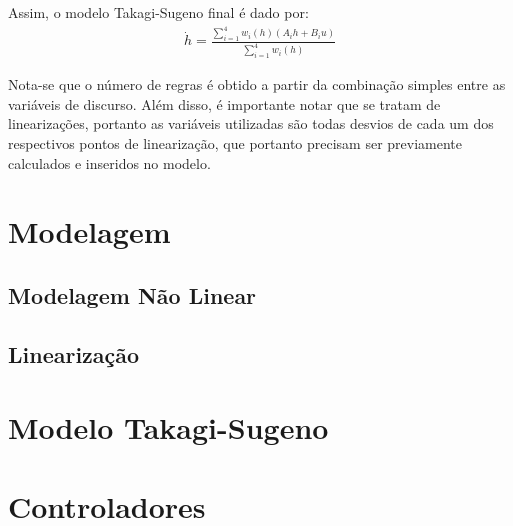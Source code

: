 \begin{itemize}
	Assim, o modelo Takagi-Sugeno final é dado por:
	\begin{align*}
		\dot{h} = \frac{\sum_{i=1}^{4}  w_i(h)(A_ih + B_i u)}{\sum_{i=1}^{4} w_i(h)}
	\end{align*}
	
	Nota-se que o número de regras é obtido a partir da combinação simples entre as variáveis de discurso. Além disso, é importante notar que se tratam de linearizações, portanto as variáveis utilizadas são todas desvios de cada um dos respectivos pontos de linearização, que portanto precisam ser previamente calculados e inseridos no modelo.
	
\end{itemize}

\section{Modelagem}
\subsection{Modelagem Não Linear}
\subsection{Linearização}

\section{Modelo Takagi-Sugeno}

\section{Controladores}

%

